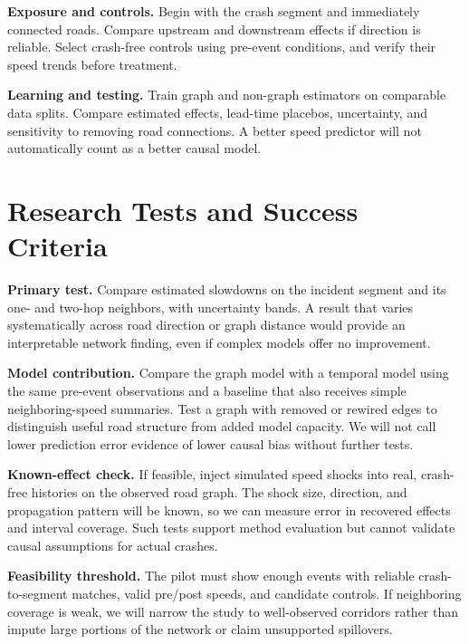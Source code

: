 \documentclass[sigconf,nonacm]{acmart}
\begin{document}
\textbf{Exposure and controls.} Begin with the crash segment and immediately connected roads. Compare upstream and downstream effects if direction is reliable. Select crash-free controls using pre-event conditions, and verify their speed trends before treatment.

\textbf{Learning and testing.} Train graph and non-graph estimators on comparable data splits. Compare estimated effects, lead-time placebos, uncertainty, and sensitivity to removing road connections. A better speed predictor will not automatically count as a better causal model.

\section{Research Tests and Success Criteria}
\textbf{Primary test.} Compare estimated slowdowns on the incident segment and its one- and two-hop neighbors, with uncertainty bands. A result that varies systematically across road direction or graph distance would provide an interpretable network finding, even if complex models offer no improvement.

\textbf{Model contribution.} Compare the graph model with a temporal model using the same pre-event observations and a baseline that also receives simple neighboring-speed summaries. Test a graph with removed or rewired edges to distinguish useful road structure from added model capacity. We will not call lower prediction error evidence of lower causal bias without further tests.

\textbf{Known-effect check.} If feasible, inject simulated speed shocks into real, crash-free histories on the observed road graph. The shock size, direction, and propagation pattern will be known, so we can measure error in recovered effects and interval coverage. Such tests support method evaluation but cannot validate causal assumptions for actual crashes.

\textbf{Feasibility threshold.} The pilot must show enough events with reliable crash-to-segment matches, valid pre/post speeds, and candidate controls. If neighboring coverage is weak, we will narrow the study to well-observed corridors rather than impute large portions of the network or claim unsupported spillovers.

\end{document}
